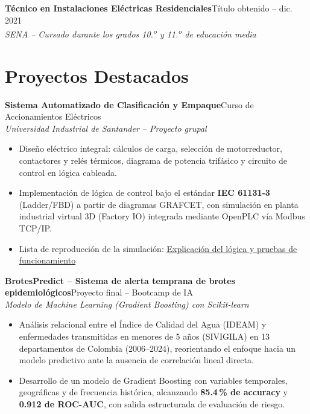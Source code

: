 \documentclass[10pt,a4paper]{article}
\newcommand{\entrada}[3]{%
    \noindent\textbf{\color{primario}#1}\hfill{\small\color{secundario}#2}\\[0pt]
    {\small\itshape\color{secundario}#3}\par\vspace{1pt}%
}
\begin{document}
\entrada{Técnico en Instalaciones Eléctricas Residenciales}{Título obtenido -- dic. 2021}{SENA -- Cursado durante los grados 10.\textsuperscript{o} y 11.\textsuperscript{o} de educación media}

\section*{Proyectos Destacados}

\entrada{Sistema Automatizado de Clasificación y Empaque}{Curso de Accionamientos Eléctricos}{Universidad Industrial de Santander -- Proyecto grupal}
\begin{itemize}
    \item Diseño eléctrico integral: cálculos de carga, selección de motorreductor, contactores y relés térmicos, diagrama de potencia trifásico y circuito de control en lógica cableada.
    \item Implementación de lógica de control bajo el estándar \textbf{IEC 61131-3} (Ladder/FBD) a partir de diagramas GRAFCET, con simulación en planta industrial virtual 3D (Factory IO) integrada mediante OpenPLC vía Modbus TCP/IP.
    \item Lista de reproducción de la simulación: \href{https://youtube.com/playlist?list=PLUTAdDOdTlkNAtmTmna0_Z4TgAq-pZNoZ&si=ZV5tGop65upxRSAQ}{Explicación del lógica y pruebas de funcionamiento}
\end{itemize}
\vspace{1pt}

\entrada{BrotesPredict -- Sistema de alerta temprana de brotes epidemiológicos}{Proyecto final -- Bootcamp de IA}{Modelo de Machine Learning (Gradient Boosting) con Scikit-learn}
\begin{itemize}
    \item Análisis relacional entre el Índice de Calidad del Agua (IDEAM) y enfermedades transmitidas en menores de 5 años (SIVIGILA) en 13 departamentos de Colombia (2006--2024), reorientando el enfoque hacia un modelo predictivo ante la ausencia de correlación lineal directa.
    \item Desarrollo de un modelo de Gradient Boosting con variables temporales, geográficas y de frecuencia histórica, alcanzando \textbf{85.4\,\% de accuracy} y \textbf{0.912 de ROC-AUC}, con salida estructurada de evaluación de riesgo.
\end{itemize}
\vspace{1pt}
\end{document}
